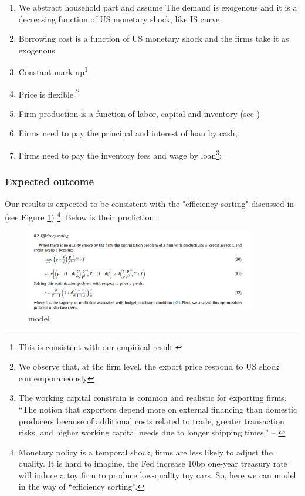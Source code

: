 \documentclass[12pt]{article}
\begin{document}
\begin{enumerate}
    \item We abstract household part and assume The demand is exogenous and it is a decreasing function of US monetary shock, like IS curve.
    \item Borrowing cost is a function of US monetary shock and the firms take it as exogenous
    \item Constant mark-up\footnote{This is consistent with our empirical result.}
    \item Price is flexible \footnote{We observe that, at the firm level, the export price respond to US shock contemporaneously}
    \item Firm production is a function of labor, capital and inventory (see \cite{corugedo2011understanding})
    \item Firms need to pay the principal and interest of loan by cash;
    \item Firms need to pay the inventory fees and wage by loan\footnote{The working capital constrain is common and realistic for exporting firms. “The notion that exporters depend more on external financing than domestic producers because of additional costs related to trade, greater transaction risks, and higher working capital needs due to longer shipping times.” -- \cite{manova2013credit}};
\end{enumerate}


\subsubsection{Expected outcome}

Our results is expected to be consistent with the "efficiency sorting" discussed in \cite{fan2015credit} (see Figure \ref{fig: FLL_model}) \footnote{Monetary policy is a temporal shock, firms are less likely to adjust the quality. It is hard to imagine, the Fed increase 10bp one-year treasury rate will induce a toy firm to produce low-quality toy cars. So, here we can model in the way of “efficiency sorting”.}. Below is their prediction:



\begin{figure}
     \centering
         \includegraphics[width=0.9\textwidth]{latex/2023.10/Picture/FLL_model.png}
         \caption{\cite{fan2015credit} model}
         \label{fig: FLL_model}
\end{figure}
 
\end{document}
